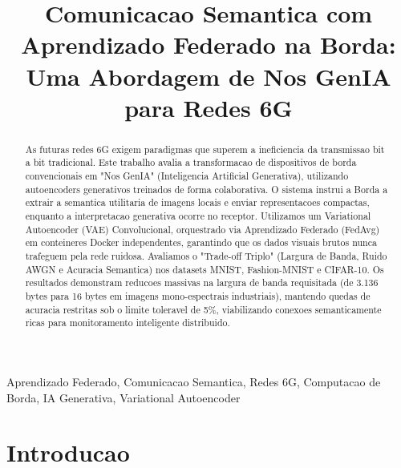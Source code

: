 \documentclass[conference]{IEEEtran}
\begin{document}
\title{Comunicacao Semantica com Aprendizado Federado na Borda: Uma Abordagem de Nos GenIA para Redes 6G}

\author{
}

\maketitle

\begin{abstract}
As futuras redes 6G exigem paradigmas que superem a ineficiencia da transmissao bit a bit tradicional. Este trabalho avalia a transformacao de dispositivos de borda convencionais em "Nos GenIA" (Inteligencia Artificial Generativa), utilizando autoencoders generativos treinados de forma colaborativa. O sistema instrui a Borda a extrair a semantica utilitaria de imagens locais e enviar representacoes compactas, enquanto a interpretacao generativa ocorre no receptor. Utilizamos um Variational Autoencoder (VAE) Convolucional, orquestrado via Aprendizado Federado (FedAvg) em conteineres Docker independentes, garantindo que os dados visuais brutos nunca trafeguem pela rede ruidosa. Avaliamos o "Trade-off Triplo" (Largura de Banda, Ruido AWGN e Acuracia Semantica) nos datasets MNIST, Fashion-MNIST e CIFAR-10. Os resultados demonstram reducoes massivas na largura de banda requisitada (de 3.136 bytes para 16 bytes em imagens mono-espectrais industriais), mantendo quedas de acuracia restritas sob o limite toleravel de 5\%, viabilizando conexoes semanticamente ricas para monitoramento inteligente distribuido.
\end{abstract}

\begin{IEEEkeywords}
Aprendizado Federado, Comunicacao Semantica, Redes 6G, Computacao de Borda, IA Generativa, Variational Autoencoder
\end{IEEEkeywords}

\section{Introducao}
\end{document}
